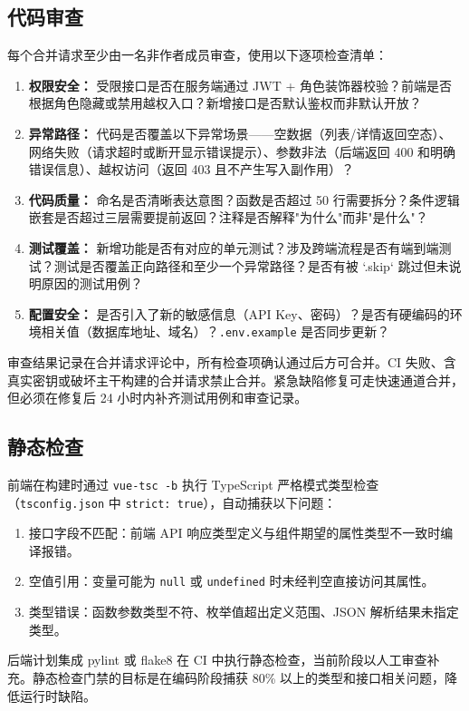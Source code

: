 \documentclass[12pt,a4paper]{ctexart}
\begin{document}
\subsection{代码审查}
每个合并请求至少由一名非作者成员审查，使用以下逐项检查清单：
\begin{enumerate}
\item \textbf{权限安全：} 受限接口是否在服务端通过 JWT + 角色装饰器校验？前端是否根据角色隐藏或禁用越权入口？新增接口是否默认鉴权而非默认开放？
\item \textbf{异常路径：} 代码是否覆盖以下异常场景——空数据（列表/详情返回空态）、网络失败（请求超时或断开显示错误提示）、参数非法（后端返回 400 和明确错误信息）、越权访问（返回 403 且不产生写入副作用）？
\item \textbf{代码质量：} 命名是否清晰表达意图？函数是否超过 50 行需要拆分？条件逻辑嵌套是否超过三层需要提前返回？注释是否解释"为什么"而非"是什么"？
\item \textbf{测试覆盖：} 新增功能是否有对应的单元测试？涉及跨端流程是否有端到端测试？测试是否覆盖正向路径和至少一个异常路径？是否有被 `.skip` 跳过但未说明原因的测试用例？
\item \textbf{配置安全：} 是否引入了新的敏感信息（API Key、密码）？是否有硬编码的环境相关值（数据库地址、域名）？\texttt{.env.example} 是否同步更新？
\end{enumerate}
审查结果记录在合并请求评论中，所有检查项确认通过后方可合并。CI 失败、含真实密钥或破坏主干构建的合并请求禁止合并。紧急缺陷修复可走快速通道合并，但必须在修复后 24 小时内补齐测试用例和审查记录。

\subsection{静态检查}
前端在构建时通过 \texttt{vue-tsc -b} 执行 TypeScript 严格模式类型检查（\texttt{tsconfig.json} 中 \texttt{strict: true}），自动捕获以下问题：
\begin{enumerate}
\item 接口字段不匹配：前端 API 响应类型定义与组件期望的属性类型不一致时编译报错。
\item 空值引用：变量可能为 \texttt{null} 或 \texttt{undefined} 时未经判空直接访问其属性。
\item 类型错误：函数参数类型不符、枚举值超出定义范围、JSON 解析结果未指定类型。
\end{enumerate}
后端计划集成 pylint 或 flake8 在 CI 中执行静态检查，当前阶段以人工审查补充。静态检查门禁的目标是在编码阶段捕获 80\% 以上的类型和接口相关问题，降低运行时缺陷。
\end{document}
